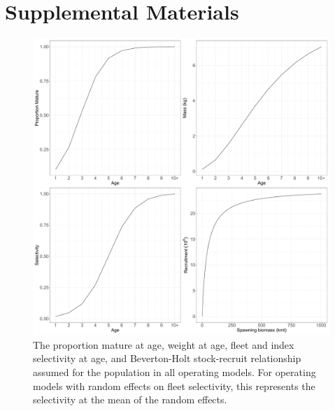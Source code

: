 \documentclass[
  12pt,
]{article}
\begin{document}
\hypertarget{supplemental-materials}{%
\section*{Supplemental Materials}\label{supplemental-materials}}

\setcounter{figure}{0}
\renewcommand\thefigure{S\arabic{figure}}

\begin{figure}
\begin{center}
\includegraphics[width = \textwidth]{om_input_plots_figure}
\end{center}
\caption{The proportion mature at age, weight at age, fleet and index selectivity at age, and Beverton-Holt stock-recruit relationship assumed for the population in all operating models. For operating models with random effects on fleet selectivity, this represents the selectivity at the mean of the random effects.}\label{om_inputs_fig}
\end{figure}
\end{document}
